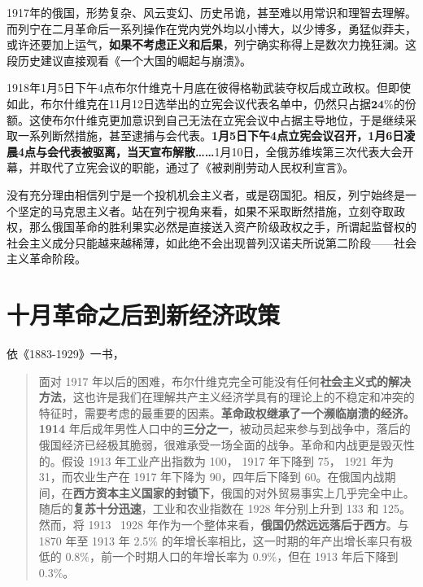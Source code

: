 1917年的俄国，形势复杂、风云变幻、历史吊诡，甚至难以用常识和理智去理解。而列宁在二月革命后一系列操作在党内党外均以小博大，以少博多，勇猛似莽夫，或许还要加上运气，\textbf{如果不考虑正义和后果}，列宁确实称得上是数次力挽狂澜。这段历史建议直接观看《一个大国的崛起与崩溃》。

1918年1月5日下午4点布尔什维克十月底在彼得格勒武装夺权后成立政权。但即使如此，布尔什维克在11月12日选举出的立宪会议代表名单中，仍然只占据$\mathbf{24\%}$的份额。这使布尔什维克更加意识到自己无法在立宪会议中占据主导地位，于是继续采取一系列断然措施，甚至逮捕与会代表。\textbf{1月5日下午4点立宪会议召开，1月6日凌晨4点与会代表被驱离，当天宣布解散……}1月10日，全俄苏维埃第三次代表大会开幕，并取代了立宪会议的职能，通过了《被剥削劳动人民权利宣言》。

没有充分理由相信列宁是一个投机机会主义者，或是窃国犯。相反，列宁始终是一个坚定的马克思主义者。站在列宁视角来看，如果不采取断然措施，立刻夺取政权，那么俄国革命的胜利果实必然是直接送入资产阶级政权之手，所谓起监督权的社会主义成分只能越来越稀薄，如此绝不会出现普列汉诺夫所说第二阶段——社会主义革命阶段。

\section{十月革命之后到新经济政策}依《1883-1929》一书，
\begin{quotation}面对 1917 年以后的困难，布尔什维克完全可能没有任何\textbf{社会主义式的解决方法}，这也许是我们在理解共产主义经济学具有的理论上的不稳定和冲突的特征时，需要考虑的最重要的因素。\textbf{革命政权继承了一个濒临崩溃的经济。 1914} 年后成年男性人口中的\textbf{三分之一}，被动员起来参与到战争中，落后的俄国经济已经极其脆弱，很难承受一场全面的战争。革命和内战更是毁灭性的。假设 1913 年工业产出指数为 100， 1917 年下降到 75， 1921 年为 31，而农业生产在 1917 年下降为 90，四年后下降到 60。在俄国内战期间，在\textbf{西方资本主义国家的封锁下}，俄国的对外贸易事实上几乎完全中止。随后的\textbf{复苏十分迅速}，工业和农业指数在 1928 年分别上升到 133 和 125。然而，将 1913~ 1928 年作为一个整体来看，\textbf{俄国仍然远远落后于西方}。与 1870 年至 1913 年 2.5\% 的年增长率相比，这一时期的年产出增长率只有极低的 0.8\%，前一个时期人口的年增长率为 0.9\%，但在 1913 年后下降到 0.3\%。
\end{quotation}


